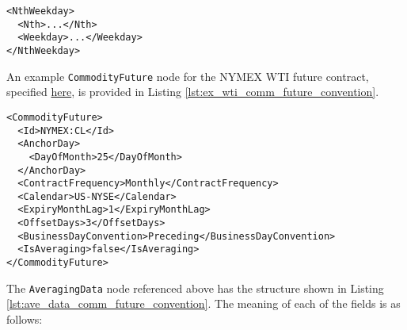 \begin{itemize}
\end{itemize}

\begin{listing}[h!]
\begin{verbatim}
<NthWeekday>
  <Nth>...</Nth>
  <Weekday>...</Weekday>
</NthWeekday>
\end{verbatim}
\caption{\textnormal{\lstinline!NthWeekday!} node outline}
\label{lst:nth_weekday_node}
\end{listing}

An example \lstinline!CommodityFuture! node for the NYMEX WTI future contract, specified \href{https://www.cmegroup.com/trading/energy/crude-oil/light-sweet-crude_contract_specifications.html}{here}, is provided in Listing \ref{lst:ex_wti_comm_future_convention}.

\begin{listing}[h!]
\begin{verbatim}
<CommodityFuture>
  <Id>NYMEX:CL</Id>
  <AnchorDay>
    <DayOfMonth>25</DayOfMonth>
  </AnchorDay>
  <ContractFrequency>Monthly</ContractFrequency>
  <Calendar>US-NYSE</Calendar>
  <ExpiryMonthLag>1</ExpiryMonthLag>
  <OffsetDays>3</OffsetDays>
  <BusinessDayConvention>Preceding</BusinessDayConvention>
  <IsAveraging>false</IsAveraging>
</CommodityFuture>
\end{verbatim}
\caption{NYMEX WTI \textnormal{\lstinline!CommodityFuture!} node}
\label{lst:ex_wti_comm_future_convention}
\end{listing}

The \lstinline!AveragingData! node referenced above has the structure shown in Listing \ref{lst:ave_data_comm_future_convention}. The meaning of each of the fields is as follows:

